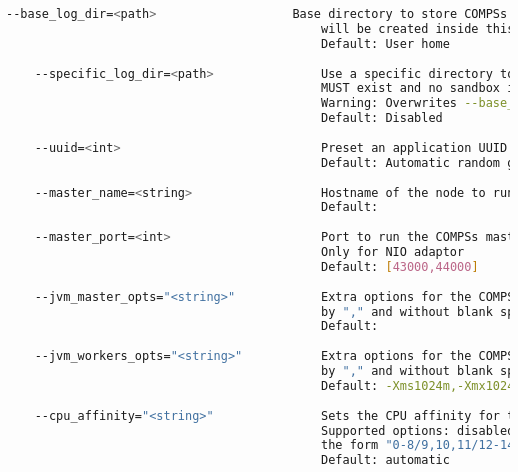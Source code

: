 \begin{lstlisting}[language=bash]
    --base_log_dir=<path>                   Base directory to store COMPSs log files (a .COMPSs/ folder
                                            will be created inside this location)
                                            Default: User home
                                            
    --specific_log_dir=<path>               Use a specific directory to store COMPSs log files (the folder
                                            MUST exist and no sandbox is created)
                                            Warning: Overwrites --base_log_dir option
                                            Default: Disabled
                                            
    --uuid=<int>                            Preset an application UUID
                                            Default: Automatic random generation
                                            
    --master_name=<string>                  Hostname of the node to run the COMPSs master
                                            Default: 
                                            
    --master_port=<int>                     Port to run the COMPSs master communications.
                                            Only for NIO adaptor
                                            Default: [43000,44000]
                                            
    --jvm_master_opts="<string>"            Extra options for the COMPSs Master JVM. Each option separed
                                            by "," and without blank spaces (Notice the quotes)
                                            Default: 
                                            
    --jvm_workers_opts="<string>"           Extra options for the COMPSs Workers JVMs. Each option separed
                                            by "," and without blank spaces (Notice the quotes)
                                            Default: -Xms1024m,-Xmx1024m,-Xmn400m
                                            
    --cpu_affinity="<string>"               Sets the CPU affinity for the workers
                                            Supported options: disabled, automatic, user defined map of
                                            the form "0-8/9,10,11/12-14,15,16"
                                            Default: automatic
                                            

\end{lstlisting}
